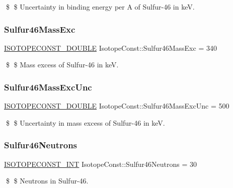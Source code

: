 \$ \$ Uncertainty in binding energy per A of Sulfur-\/46 in keV. \mbox{\label{group___isotope_const-_sulfur-_s46_ga97965a547b455a19d5ecb45723174bd8}} 
\subsubsection{\texorpdfstring{Sulfur46\+Mass\+Exc}{Sulfur46MassExc}}
{\footnotesize\ttfamily \mbox{\hyperlink{group___isotope_const-_macros_ga8f45a7272ce02c0b4c65c44636ed719a}{I\+S\+O\+T\+O\+P\+E\+C\+O\+N\+S\+T\+\_\+\+D\+O\+U\+B\+LE}} Isotope\+Const\+::\+Sulfur46\+Mass\+Exc = 340}

\$ \$ Mass excess of Sulfur-\/46 in keV. \mbox{\label{group___isotope_const-_sulfur-_s46_ga70f920d82b48183b8a5612e6304b9280}} 
\subsubsection{\texorpdfstring{Sulfur46\+Mass\+Exc\+Unc}{Sulfur46MassExcUnc}}
{\footnotesize\ttfamily \mbox{\hyperlink{group___isotope_const-_macros_ga8f45a7272ce02c0b4c65c44636ed719a}{I\+S\+O\+T\+O\+P\+E\+C\+O\+N\+S\+T\+\_\+\+D\+O\+U\+B\+LE}} Isotope\+Const\+::\+Sulfur46\+Mass\+Exc\+Unc = 500}

\$ \$ Uncertainty in mass excess of Sulfur-\/46 in keV. \mbox{\label{group___isotope_const-_sulfur-_s46_ga7cee5ce55d27ad25a68752d885b70d63}} 
\subsubsection{\texorpdfstring{Sulfur46\+Neutrons}{Sulfur46Neutrons}}
{\footnotesize\ttfamily \mbox{\hyperlink{group___isotope_const-_macros_ga5f18360b3e99483a35c32d789e62621c}{I\+S\+O\+T\+O\+P\+E\+C\+O\+N\+S\+T\+\_\+\+I\+NT}} Isotope\+Const\+::\+Sulfur46\+Neutrons = 30}

\$ \$ Neutrons in Sulfur-\/46. \mbox{\label{group___isotope_const-_sulfur-_s46_ga6cd9cf6980b8f206711b4a7e3462ef1d}} 
